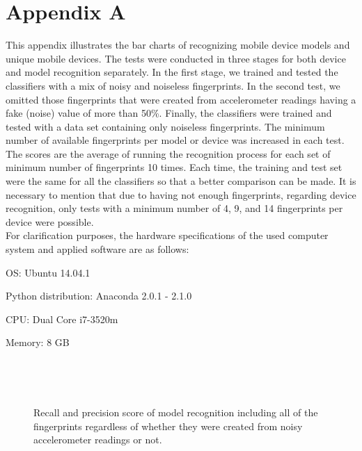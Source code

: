 \chapter{Appendix A}
\label{ch:appendixa}
This appendix illustrates the bar charts of recognizing mobile device models and unique mobile devices. The tests were conducted in three stages for both device and model recognition separately. In the first stage, we trained and tested the classifiers with a mix of noisy and noiseless fingerprints. In the second test, we omitted those fingerprints that were created from accelerometer readings having a fake (noise) value of more than 50\%. Finally, the classifiers were trained and tested with a data set containing only noiseless fingerprints. The minimum number of available fingerprints per model or device was increased in each test. The scores are the average of running the recognition process for each set of minimum number of fingerprints 10 times. Each time, the training and test set were the same for all the classifiers so that a better comparison can be made. It is necessary to mention that due to having not enough fingerprints, regarding device recognition, only tests with a minimum number of 4, 9, and 14 fingerprints per device were possible.\\
For clarification purposes, the hardware specifications of the used computer system and applied software are as follows:
\begin{compactitem}
	\item OS: Ubuntu 14.04.1
	\item Python distribution: Anaconda 2.0.1 - 2.1.0
	\item CPU: Dual Core i7-3520m
	\item Memory: 8 GB
\end{compactitem}
\begin{figure}[htb]
	\,
	\,
\end{figure}
\begin{figure}
	\ContinuedFloat
	\,
	\,
	\caption{Recall and precision score of model recognition including all of the fingerprints regardless of whether they were created from noisy accelerometer readings or not.}
\end{figure}
